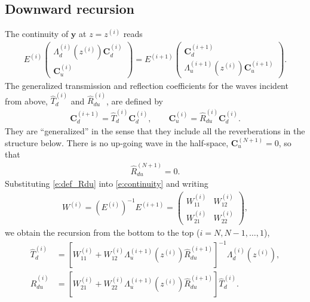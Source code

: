 \documentclass[a4paper, 10pt]{article}
\begin{document}
\subsection{Downward recursion}

The continuity of $\symbf{y}$ at $z = z^{(i)}$ reads
\begin{align}
  E^{(i)}
  \begin{pmatrix}
    \Lambda_d^{(i)}(z^{(i)}) \symbf{C}_d^{(i)} \\
    \symbf{C}_u^{(i)}
  \end{pmatrix}
  =
  E^{(i + 1)}
  \begin{pmatrix}
    \symbf{C}_d^{(i + 1)} \\
    \Lambda_u^{(i + 1)}(z^{(i)}) \symbf{C}_u^{(i + 1)}
  \end{pmatrix}.
  \label{e:continuity}
\end{align}
The generalized transmission and reflection coefficients for the waves incident from above, $\hat{T}_d^{(i)}$ and $\hat{R}_{du}^{(i)}$, are defined by
\begin{align}
  \symbf{C}_d^{(i + 1)} = \hat{T}_d^{(i)} \symbf{C}_d^{(i)}, \qquad
  \symbf{C}_u^{(i)} = \hat{R}_{du}^{(i)} \symbf{C}_d^{(i)}.
  \label{e:def_Rdu}
\end{align}
They are ``generalized'' in the sense that they include all the reverberations in the structure below.
There is no up-going wave in the half-space, $\symbf{C}_u^{(N + 1)} = 0$, so that
\begin{align}
  \hat{R}_{du}^{(N + 1)} = 0.
\end{align}
Substituting \eqref{e:def_Rdu} into \eqref{e:continuity} and writing
\begin{align}
  W^{(i)} = \left( E^{(i)} \right)^{-1} E^{(i + 1)} =
  \begin{pmatrix}
    W_{11}^{(i)} & W_{12}^{(i)} \\
    W_{21}^{(i)} & W_{22}^{(i)}
  \end{pmatrix},
\end{align}
we obtain the recursion from the bottom to the top ($i = N, N - 1, \dots, 1$),
\begin{align}
  \hat{T}_d^{(i)} &=
  \left[ W_{11}^{(i)} + W_{12}^{(i)} \Lambda_u^{(i + 1)}(z^{(i)}) \hat{R}_{du}^{(i + 1)} \right]^{-1}
  \Lambda_d^{(i)}(z^{(i)}),
  \\
  \hat{R}_{du}^{(i)} &=
  \left[ W_{21}^{(i)} + W_{22}^{(i)} \Lambda_u^{(i + 1)}(z^{(i)}) \hat{R}_{du}^{(i + 1)} \right]
  \hat{T}_d^{(i)}.
\end{align}
\end{document}
